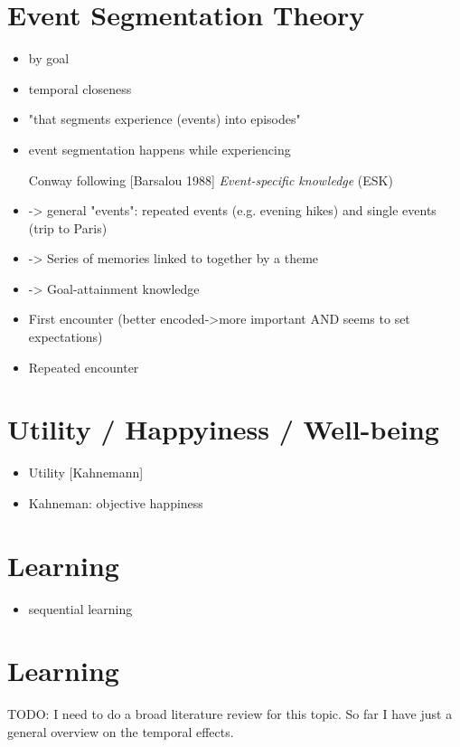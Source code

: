 \section{Event Segmentation Theory}
\cite{black_episodes_1979}\cite{ezzyat_what_2011}\cite{zacks_perceiving_2001}
\begin{itemize}
\item by goal \cite{black_episodes_1979}
\item temporal closeness \cite{black_episodes_1979}\cite{ezzyat_what_2011}
\item "that segments experience (events) into episodes" \cite[248]{ezzyat_what_2011}
\item event segmentation happens while experiencing \cite[248]{ezzyat_what_2011}

\item [Conway] following [Barsalou 1988] \textit{Event-specific knowledge} (ESK)
\item -> general "events": repeated events (e.g. evening hikes) and single events (trip to Paris)
\item -> Series of memories linked to together by a theme
\item -> Goal-attainment knowledge
\item First encounter (better encoded->more important AND seems to set expectations)
\item Repeated encounter
\end{itemize}

\section{Utility / Happyiness / Well-being}
\begin{itemize}
\item Utility [Kahnemann]
\item Kahneman: objective happiness
\end{itemize}

\section{Learning}
\begin{itemize}
\item sequential learning
\end{itemize}

\section{Learning}
TODO: I need to do a broad literature review for this topic.
So far I have just a general overview on the temporal effects.


